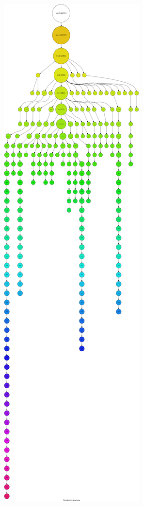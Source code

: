 \begin{landscape}
\begin{figure}[p]
{\includegraphics[scale=0.07]{figures/cohesive_blocks_nucl_th_1mode}
}
\hspace{.2in}
\end{figure}
\end{landscape}
